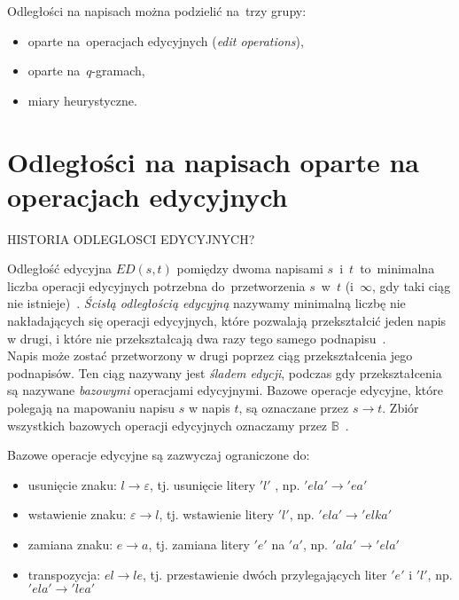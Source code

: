 \documentclass{praca1}
\begin{document}


Odległości na napisach można podzielić na~trzy grupy:
\begin{itemize}
\item oparte na~operacjach edycyjnych (\emph{edit operations}),
\item oparte na~$q$-gramach,
\item miary heurystyczne.
\end{itemize}


\section{Odległości na napisach oparte na operacjach edycyjnych}

HISTORIA ODLEGLOSCI EDYCYJNYCH?

Odległość edycyjna $ED(s,t)$ pomiędzy dwoma napisami $s$~i~$t$~to~minimalna liczba operacji edycyjnych potrzebna do~przetworzenia $s$~w~$t$ (i~$\infty$, gdy taki ciąg nie istnieje)~\cite{Navarro2001:guidedtour}. \emph{Ścisłą odległością edycyjną} nazywamy minimalną liczbę nie nakładających się operacji edycyjnych, które pozwalają przekształcić jeden napis w drugi, i które nie przekształcają dwa razy tego samego podnapisu~\cite{Boytsov2011:indexingmethods}.\\

Napis może zostać przetworzony w drugi poprzez ciąg przekształcenia jego podnapisów. Ten ciąg nazywany jest \emph{śladem edycji}, podczas gdy przekształcenia są nazywane \emph{bazowymi} operacjami edycyjnymi. Bazowe operacje edycyjne, które polegają na mapowaniu napisu $s$ w napis $t$, są oznaczane przez $s \rightarrow t$. Zbiór wszystkich bazowych operacji edycyjnych oznaczamy przez $\mathbb{B}$~\cite{Boytsov2011:indexingmethods}.


Bazowe operacje edycyjne są zazwyczaj ograniczone do:
\begin{itemize}
\item usunięcie znaku: $l \rightarrow \varepsilon$, tj. usunięcie litery $'l'$ , np. $'ela' \rightarrow 'ea'$
\item wstawienie znaku: $\varepsilon \rightarrow l$, tj. wstawienie litery $'l'$, np. $'ela' \rightarrow 'elka'$
\item zamiana znaku: $e \rightarrow a$, tj. zamiana litery $'e'$ na $'a'$, np. $'ala' \rightarrow 'ela'$
\item transpozycja: $el \rightarrow le$, tj. przestawienie dwóch przylegających liter $'e'$ i $'l'$, np. $'ela' \rightarrow 'lea'$
\end{itemize}
\end{document}
